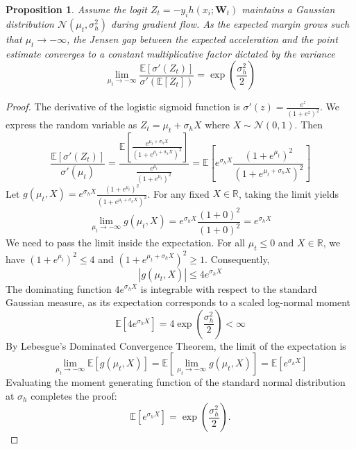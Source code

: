 \documentclass[letter,11pt]{article}
\newtheorem{proposition}{Proposition}
\begin{document}
\begin{proposition}
Assume the logit $Z_t = -y_i h(x_i; \mathbf{W}_t)$ maintains a Gaussian distribution $\mathcal{N}(\mu_t, \sigma_h^2)$ during gradient flow. As the expected margin grows such that $\mu_t \to -\infty$, the Jensen gap between the expected acceleration and the point estimate converges  to a constant multiplicative factor dictated by the variance
\begin{equation}
\lim_{\mu_t \to -\infty} \frac{\mathbb{E}[\sigma'(Z_t)]}{\sigma'(\mathbb{E}[Z_t])} = \exp \left( \frac{\sigma_h^2}{2} \right)
\end{equation}
\end{proposition}
\begin{proof}
The derivative of the logistic sigmoid function is $\sigma'(z) = \frac{e^z}{(1+e^z)^2}$. We express the random variable as $Z_t = \mu_t + \sigma_h X$ where $X \sim \mathcal{N}(0, 1)$. Then
\begin{equation}
\frac{\mathbb{E}[\sigma'(Z_t)]}{\sigma'(\mu_t)} = \frac{\mathbb{E}\left[ \frac{e^{\mu_t + \sigma_h X}}{(1 + e^{\mu_t + \sigma_h X})^2} \right]}{\frac{e^{\mu_t}}{(1+e^{\mu_t})^2}} = \mathbb{E}\left[ e^{\sigma_h X} \frac{(1+e^{\mu_t})^2}{(1 + e^{\mu_t + \sigma_h X})^2} \right]
\end{equation}
Let $g(\mu_t, X) = e^{\sigma_h X} \frac{(1+e^{\mu_t})^2}{(1 + e^{\mu_t + \sigma_h X})^2}$. For any fixed $X \in \mathbb{R}$, taking the limit yields
\begin{equation}
\lim_{\mu_t \to -\infty} g(\mu_t, X) = e^{\sigma_h X} \frac{(1+0)^2}{(1+0)^2} = e^{\sigma_h X}
\end{equation}
We need to  pass the limit inside the expectation. For all $\mu_t \le 0$ and $X \in \mathbb{R}$, we have $(1+e^{\mu_t})^2 \le 4$ and  $(1 + e^{\mu_t + \sigma_h X})^2 \ge 1$. Consequently,
\begin{equation}
|g(\mu_t, X)| \le 4 e^{\sigma_h X}
\end{equation}
The dominating function $4 e^{\sigma_h X}$ is integrable with respect to the standard Gaussian measure, as its expectation corresponds to a scaled log-normal moment
\begin{equation}
\mathbb{E}[4 e^{\sigma_h X}] = 4 \exp \left( \frac{\sigma_h^2}{2} \right) < \infty
\end{equation}
By Lebesgue's Dominated Convergence Theorem, the limit of the expectation is
\begin{equation}
\lim_{\mu_t \to -\infty} \mathbb{E}[g(\mu_t, X)] = \mathbb{E}\left[ \lim_{\mu_t \to -\infty} g(\mu_t, X) \right] = \mathbb{E}[e^{\sigma_h X}]
\end{equation}
Evaluating the moment generating function of the standard normal distribution at $\sigma_h$ completes the proof:
\begin{equation}
\mathbb{E}[e^{\sigma_h X}] = \exp \left( \frac{\sigma_h^2}{2} \right).
\end{equation}
\end{proof}
\end{document}
